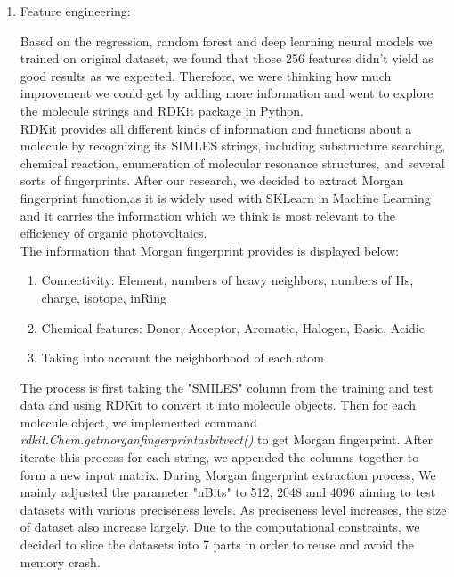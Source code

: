 \documentclass[11pt]{article}
\begin{document}
\begin{enumerate}
\begin{enumerate}
\end{enumerate}
\item Feature engineering: 

Based on the regression, random forest and deep learning neural models we trained on original dataset, we found that those 256 features didn't yield as good results as we expected. Therefore, we were thinking how much improvement we could get by adding more information and went to explore the molecule strings and RDKit package in Python. \\

RDKit provides all different kinds of information and functions about a molecule by recognizing its SIMLES strings, including substructure searching, chemical reaction, enumeration of molecular resonance structures, and several sorts of fingerprints. After our research, we decided to extract Morgan fingerprint function,as it is widely used with SKLearn in Machine Learning and it carries the information which we think is most relevant to the efficiency of organic photovoltaics. \\ 

The information that Morgan fingerprint provides is displayed below:
\begin{enumerate}
\item Connectivity: Element, numbers of heavy neighbors, numbers of Hs, charge, isotope, inRing
\item Chemical features: Donor, Acceptor, Aromatic, Halogen, Basic, Acidic
\item Taking into account the neighborhood of each atom\\
\end{enumerate}
The process is first taking the "SMILES" column from the training and test data and using RDKit to convert it into molecule objects. Then for each molecule object, we implemented command {\itshape rdkit.Chem.getmorganfingerprintasbitvect()} to get Morgan fingerprint. After iterate this process for each string, we appended the columns together to form a new input matrix. During Morgan fingerprint extraction process, We mainly adjusted the parameter "nBits" to 512, 2048 and 4096 aiming to test datasets with various preciseness levels. As preciseness level increases, the size of dataset also increase largely. Due to the computational constraints, we decided to slice the datasets into 7 parts in order to reuse and avoid the memory crash. \\

\end{enumerate}
\end{document}
